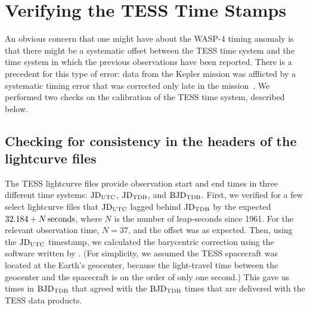 \documentclass[12pt,twocolumn,tighten]{aastex62}
\begin{document}
\clearpage
\newpage






\clearpage

                            
 


\appendix

\section{Verifying the TESS Time Stamps}
\label{sec:verify_tess}

An obvious concern that one might have about the WASP-4 timing anomaly
is that there might be a systematic offset between the TESS time
system and the time system in which the previous observations have
been reported.  There is a precedent for this type of error: data from
the Kepler mission was afflicted by a systematic timing error that was
corrected only late in the mission~\citep[][Section
  3.4]{kepler_DR19_2013}. We performed two checks on the calibration
of the TESS time system, described below.

\subsection{Checking for consistency in the headers of the lightcurve files}
\label{sec:headers}

The TESS lightcurve files provide observation start and end times in
three different time systems: ${\rm JD}_{\rm UTC}$, ${\rm JD}_{\rm
TDB}$, and ${\rm BJD}_{\rm TDB}$.  First, we verified for a few select
lightcurve files that ${\rm JD}_{\rm UTC}$ lagged behind ${\rm
JD}_{\rm TDB}$ by the expected $32.184 + N\,{\rm seconds}$, where $N$
is the number of leap-seconds since 1961. For the relevant observation
time, $N=37$, and the offset was as expected.  Then, using the ${\rm
JD}_{\rm UTC}$ timestamp, we calculated the barycentric correction
using the software written by \citealt{eastman_achieving_2010}.  (For
simplicity, we assumed the TESS spacecraft was located at the Earth's
geocenter, because the light-travel time between the geocenter and the
spacecraft is on the order of only one second.)  This gave us times in
${\rm BJD}_{\rm TDB}$ that agreed with the ${\rm BJD}_{\rm TDB}$ times
that are delivered with the TESS data products.
\end{document}
